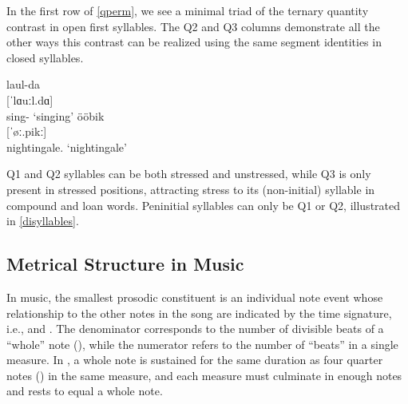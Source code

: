 In the first row of \ref{qperm}, we see a minimal triad of the ternary quantity contrast in open first syllables. The Q2 and Q3 columns demonstrate all the other ways this contrast can be realized using the same segment identities in closed syllables. 

\begin{exe}
\ex \gll laul-da \\
	{[ˈlɑuːl.dɑ]} \\
	sing-\Tr{} 
	\glt	`singing'
\ex 	ööbik \\
	{[ˈøː.pikː]} \\
	nightingale.\Nom{} 
	\glt`nightingale'
\label{disyllables}
\end{exe}
Q1 and Q2 syllables can be both stressed and unstressed, while Q3 is only present in stressed positions, attracting stress to its (non-initial) syllable in compound and loan words. Peninitial syllables can only be Q1 or Q2, illustrated in \ref{disyllables}. 


%
%
%
%

\subsection{Metrical Structure in Music} 
In music, the smallest prosodic constituent is an individual note event whose relationship to the other notes in the song are indicated by the time signature, i.e.,  and . The denominator corresponds to the number of divisible beats of a ``whole'' note (\semibreve), while the numerator refers to the number of ``beats'' in a single measure. In  , a whole note is sustained for the same duration as  four quarter notes (\crotchet) in the same measure, and each measure must culminate in enough notes and rests to equal a whole note. 
 

